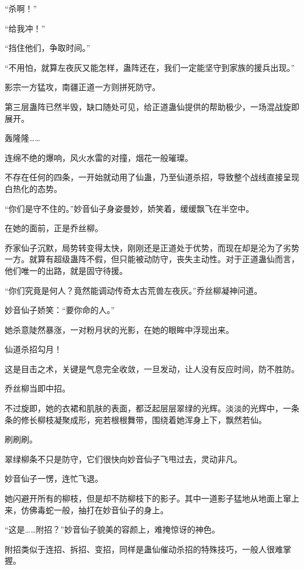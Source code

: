 
\begin{this_body}

“杀啊！”

“给我冲！”

“挡住他们，争取时间。”

“不用怕，就算左夜灰又能怎样，蛊阵还在，我们一定能坚守到家族的援兵出现。”

影宗一方猛攻，南疆正道一方则拼死防守。

第三层蛊阵已然半毁，缺口随处可见，给正道蛊仙提供的帮助极少，一场混战旋即展开。

轰隆隆……

连绵不绝的爆响，风火水雷的对撞，烟花一般璀璨。

不存在任何的四条，一开始就动用了仙蛊，乃至仙道杀招，导致整个战线直接呈现白热化的态势。

“你们是守不住的。”妙音仙子身姿曼妙，娇笑着，缓缓飘飞在半空中。

在她的面前，正是乔丝柳。

乔家仙子沉默，局势转变得太快，刚刚还是正道处于优势，而现在却是沦为了劣势一方。就算有超级蛊阵不假，但只能被动防守，丧失主动性。对于正道蛊仙而言，他们唯一的出路，就是固守待援。

“你们究竟是何人？竟然能调动传奇太古荒兽左夜灰。”乔丝柳凝神问道。

妙音仙子娇笑：“要你命的人。”

她杀意陡然暴涨，一对粉月状的光影，在她的眼眸中浮现出来。

仙道杀招勾月！

这是目击之术，关键是气息完全收敛，一旦发动，让人没有反应时间，防不胜防。

乔丝柳当即中招。

不过旋即，她的衣裙和肌肤的表面，都泛起层层翠绿的光辉。淡淡的光辉中，一条条的修长柳枝凝聚成形，宛若根根舞带，围绕着她浑身上下，飘然若仙。

刷刷刷。

翠绿柳条不只是防守，它们很快向妙音仙子飞甩过去，灵动非凡。

妙音仙子一愣，连忙飞退。

她闪避开所有的柳枝，但是却不防柳枝下的影子。其中一道影子猛地从地面上窜上来，仿佛毒蛇一般，抽打在妙音仙子的身上。

“这是……附招？”妙音仙子貌美的容颜上，难掩惊讶的神色。

附招类似于连招、拆招、变招，同样是蛊仙催动杀招的特殊技巧，一般人很难掌握。


\end{this_body}
